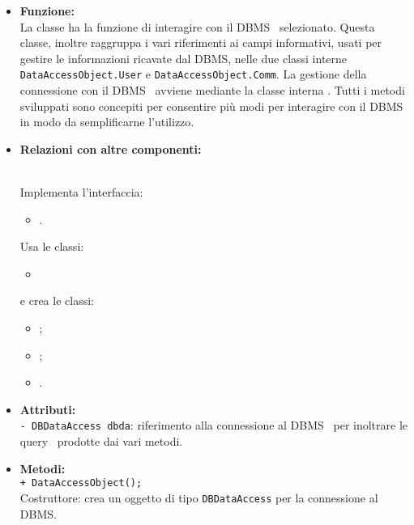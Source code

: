 {\begin{sloppypar}
{{{{\begin{itemize}
				\item[] \textbf{Funzione:}{\\
				La classe ha la funzione di interagire con il DBMS\g~ selezionato. Questa classe, inoltre raggruppa i vari riferimenti ai campi informativi, usati per gestire le informazioni ricavate dal DBMS\g, nelle due classi interne \texttt{DataAccessObject.User} e \texttt{DataAccessObject.Comm}. La gestione della connessione con il DBMS\g~ avviene mediante la classe interna .
				Tutti i metodi sviluppati sono concepiti per consentire più modi per interagire con il DBMS\g~ in modo da semplificarne l'utilizzo.\\
				 }
			
			\item[] \textbf{Relazioni con altre componenti:}{\\			
				Implementa l’interfaccia: 
					\begin{itemize}
						\item[] .
					\end{itemize}
				Usa le classi:
					\begin{itemize}
				 		\item[] 
				 	\end{itemize}
				e crea le classi:
					\begin{itemize}
						\item[];
						\item[];
						\item[].\\
					\end{itemize}
				}
				
				\item[] \textbf{Attributi:}{\\
					\texttt{- DBDataAccess dbda}: riferimento alla connessione al DBMS\g~ per inoltrare le query\g~ prodotte dai vari metodi.\\
				}
				
				\item[] \textbf{Metodi:}{\\
				\texttt{+ DataAccessObject();}\\
				Costruttore: crea un oggetto di tipo \texttt{DBDataAccess} per la connessione al DBMS\g.\\
				
}
\end{itemize}}}}}
\end{sloppypar}}
